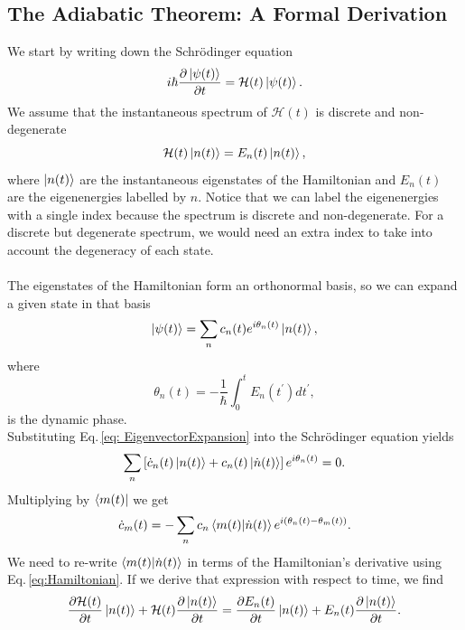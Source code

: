 \subsection{The Adiabatic Theorem: A Formal Derivation}
We start by writing down the Schrödinger equation
\begin{equation}
    i\hbar \frac{\partial \ket{\psi(t)}}{\partial t} = \mathcal{H}(t)\ket{\psi(t)}.
\end{equation}
We assume that the instantaneous spectrum of $\mathcal{H}(t)$ is discrete and non-degenerate
\begin{equation}
\label{eq:Hamiltonian}
    \mathcal{H}(t) \ket{n(t)} = E_{n}(t)\ket{n(t)},
\end{equation}
where $\ket{n(t)}$ are the instantaneous eigenstates of the Hamiltonian and $E_{n}(t)$ are the eigenenergies labelled by $n$. Notice that we can label the eigenenergies with a single index because the spectrum is discrete and non-degenerate. For a discrete but degenerate spectrum, we would need an extra index to take into account the degeneracy of each state.\\\\
The eigenstates of the Hamiltonian form an orthonormal basis, so we can expand a given state in that basis
\begin{equation}
\label{eq: EigenvectorExpansion}
    \ket{\psi(t)} = \sum_{n}c_{n}(t)e^{i\theta_{n}(t)} \ket{n(t)},
\end{equation}
where
\begin{equation}
    \theta_{n}(t) = -\frac{1}{\hbar}\int_{0}^{t}E_{n}(t^{\prime})dt^{\prime},
\end{equation}
is the dynamic phase.\\
Substituting Eq.\,\eqref{eq: EigenvectorExpansion} into the Schrödinger equation yields
\begin{equation}
    \sum_{n}\left[\dot{c}_{n}(t)\ket{n(t)} + c_{n}(t)\ket{\dot{n}(t)}\right]e^{i\theta_{n}(t)} = 0.
\end{equation}
Multiplying by $\bra{m(t)}$ we get
\begin{equation}
\label{eq:Coefficients}
    \dot{c}_{m}(t) = - \sum_{n}c_{n}\braket{m(t)|\dot{n}(t)}e^{i\left(\theta_{n}(t) - \theta_{m}(t)\right)}.
\end{equation}
We need to re-write $\braket{m(t)|\dot{n}(t)}$ in terms of the Hamiltonian's derivative using Eq.\,\eqref{eq:Hamiltonian}. If we derive that expression with respect to time, we find
\begin{equation}
    \frac{\partial \mathcal{H}(t)}{\partial t}\ket{n(t)} + \mathcal{H}(t)\frac{\partial \ket{n(t)}}{\partial t} = \frac{\partial E_{n}(t)}{\partial t} \ket{n(t)} + E_{n}(t)\frac{\partial \ket{n(t)}}{\partial t}. 
\end{equation}
